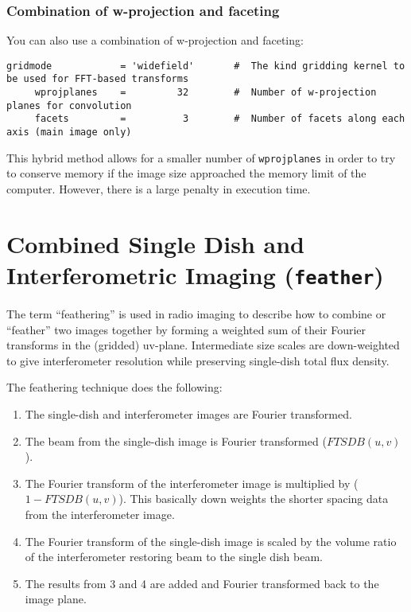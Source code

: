 \subsubsection{Combination of w-projection and faceting}
\label{section:im.clean.widefield.combo}

You can also use a combination of w-projection and faceting:
\small
\begin{verbatim}
gridmode            = 'widefield'       #  The kind gridding kernel to be used for FFT-based transforms
     wprojplanes    =         32        #  Number of w-projection planes for convolution
     facets         =          3        #  Number of facets along each axis (main image only)
\end{verbatim}
\normalsize
This hybrid method allows for a smaller number of {\tt wprojplanes} in order
to try to conserve memory if the image size approached the memory limit
of the computer.  However, there is a large penalty in execution time.

\section{Combined Single Dish and Interferometric Imaging 
         ({\tt feather})}
\label{section:im.feather}

The term ``feathering'' is used in radio imaging to describe how to
combine or ``feather'' two images together by forming a weighted
sum of their Fourier transforms in the (gridded) uv-plane.
Intermediate size scales are down-weighted to give interferometer
resolution while preserving single-dish total flux density.

The feathering technique does the following:
\begin{enumerate}
\item The single-dish and interferometer images are Fourier
      transformed.
\item The beam from the single-dish image is Fourier transformed
      ($FTSDB(u,v)$).
\item The Fourier transform of the interferometer image is multiplied
      by ($1-FTSDB(u,v)$).  This basically down weights the shorter
      spacing data from the interferometer image.
\item The Fourier transform of the single-dish image is scaled by the
      volume ratio of the interferometer restoring beam to the single
      dish beam.
\item The results from 3 and 4 are added and Fourier transformed
      back to the image plane.
\end{enumerate}


